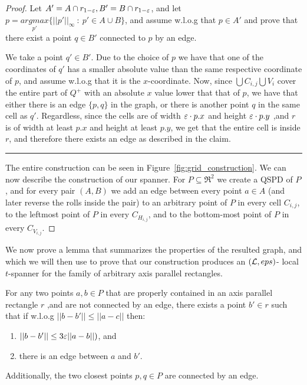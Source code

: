 \documentclass[12pt]{article}%
\begin{document}
\begin{proof}
    Let $A'=A\cap r_{1-\varepsilon}, B'=B \cap r_{1-\varepsilon}$, and let
    $p= \underset{p'}{argmax}\{||p'||_{\infty}~:~ p'\in A\cup B\}$,
    and assume w.l.o.g that $p\in A'$ and prove that there exist a
    point $q\in B'$ connected to $p$ by an edge.
    
    We take a point $q'\in B'$. Due to the choice of $p$ we have that
    one of the coordinates of $q'$ has a smaller absolute value than
    the same respective coordinate of $p$, and assume w.l.o.g that it
    is the $x$-coordinate. Now, since $\bigcup C_{i,j} \bigcup V_i$
    cover the entire part of $Q^+$ with an absolute $x$ value lower
    that that of $p$, we have that either there is an edge $\{p,q\}$
    in the graph, or there is another point $q$ in the same cell as
    $q'$. Regardless, since the cells are of width $\varepsilon\cdot p.x$ and
    height $\varepsilon\cdot p.y$ ,and $r$ is of width at least $p.x$ and
    height at least $p.y$, we get that the entire cell is inside $r$,
    and therefore there exists an edge as described in the claim.
    
    \hrule

    The entire construction can be seen in
    Figure~\ref{fig:grid_construction}. We can now describe the
    construction of our spanner. For $P\subseteq \Re^2$ we create a
    QSPD of $P$, and for every pair $(A,B)$ we add an edge between
    every point $a\in A$ (and later reverse the rolls inside the pair)
    to an arbitrary point of $P$ in every cell $C_{i,j}$, to the
    leftmost point of $P$ in every $C_{H_{i,j}}$, and to the
    bottom-most point of $P$ in every $C_{V_{i,j}}$.
\end{proof}

We now prove a lemma that summarizes the properties of the resulted
graph, and which we will then use to prove that our construction
produces an $(\mathcal{L}, eps)$- local $t$-spanner for the family of
arbitrary axis parallel rectangles.


\begin{claim}
    \label{clm:span_properties}
    For any two points $a,b\in P$ that are properly contained in an
    axis parallel rectangle $r$ ,and are not connected by an edge,
    there exists a point $b'\in r$ such that if w.l.o.g
    $||b-b'|| \leq ||a-c||$ then:
    \begin{enumerate}
        \item $||b-b'|| \leq 3\varepsilon ||a-b||)$, and
        \item there is an edge between $a$ and $b'$.
    \end{enumerate}
    Additionally, the two closest points $p,q\in P$ are connected by
    an edge.
	
\end{claim}
\end{document}
